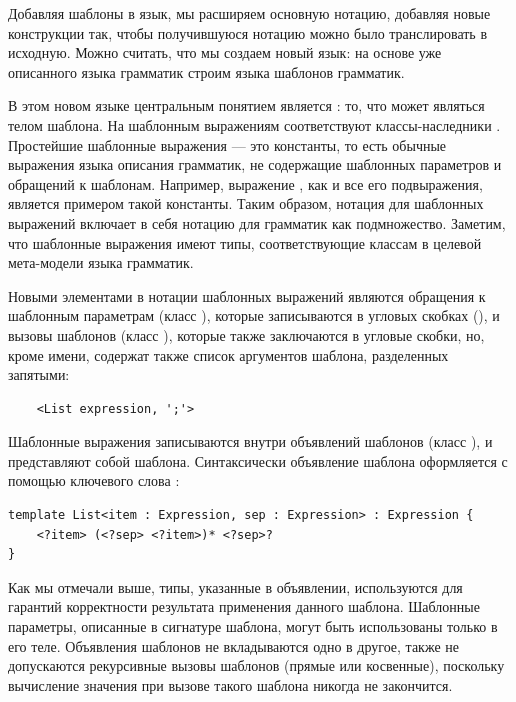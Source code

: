 Добавляя шаблоны в язык, мы расширяем основную нотацию, добавляя новые конструкции так, чтобы получившуюся нотацию можно было транслировать в исходную. Можно считать, что мы создаем новый язык: на основе уже описанного языка грамматик строим языка шаблонов грамматик.

В этом новом языке центральным понятием является : то, что может являться телом шаблона. На  шаблонным выражениям соответствуют классы-наследники . Простейшие шаблонные выражения --- это константы, то есть обычные выражения языка описания грамматик, не содержащие шаблонных параметров и обращений к шаблонам. Например, выражение , как и все его подвыражения, является примером такой константы. Таким образом, нотация для шаблонных выражений включает в себя нотацию для грамматик как подмножество. Заметим, что шаблонные выражения имеют типы, соответствующие классам в целевой мета-модели языка грамматик.

Новыми элементами в нотации шаблонных выражений являются обращения к шаблонным параметрам (класс ), которые записываются в угловых скобках (), и вызовы шаблонов (класс ), которые также заключаются в угловые скобки, но, кроме имени, содержат также список аргументов шаблона, разделенных запятыми:
\begin{lstlisting}
	<List expression, ';'>
\end{lstlisting}

Шаблонные выражения записываются внутри объявлений шаблонов (класс ), и представляют собой  шаблона. Синтаксически объявление шаблона оформляется с помощью ключевого слова :
\begin{lstlisting}[xleftmargin=.5cm]
template List<item : Expression, sep : Expression> : Expression {
	<?item> (<?sep> <?item>)* <?sep>?
}
\end{lstlisting}
Как мы отмечали выше, типы, указанные в объявлении, используются для гарантий корректности результата применения данного шаблона. Шаблонные параметры, описанные в сигнатуре шаблона, могут быть использованы только в его теле. Объявления шаблонов не вкладываются одно в другое, также не допускаются рекурсивные вызовы шаблонов (прямые или косвенные), поскольку вычисление значения при вызове такого шаблона никогда не закончится.

